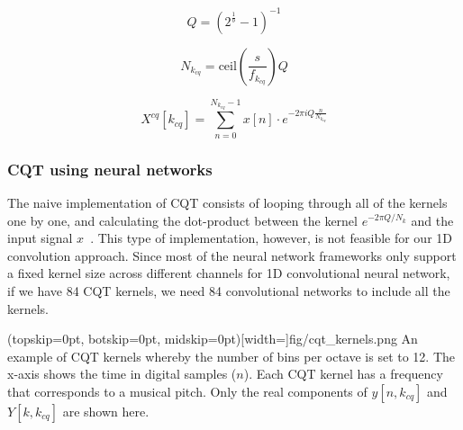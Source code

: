 \documentclass{ieeeaccess}
\begin{document}
\begin{equation}
    Q=(2^{\frac{1}{b}}-1)^{-1}
    \label{Q}
\end{equation}

\begin{equation}
    N_{k_{cq}}=   \text{ceil}{\left(\frac{s}{f_{k_{cq}}}\right)Q}
    \label{N_k}
\end{equation}

\begin{equation}
    X^{cq}[k_{cq}]= \sum_{n=0}^{N_{k_{cq}}-1}x[n]\cdot e^{-2\pi i Q \frac{n}{N_{k_{cq}}}}
    \label{CQT}
\end{equation}


\subsubsection{CQT using neural networks}
The naive implementation of CQT consists of looping through all of the kernels one by one, and calculating the dot-product between the kernel $e^{-2\pi Q/N_k}$ and the input signal $x$~\cite{brown1991calculation}. This type of implementation, however, is not feasible for our 1D convolution approach. Since most of the neural network frameworks only support a fixed kernel size across different channels for 1D convolutional neural network, if we have 84 CQT kernels, we need 84 convolutional networks to include all the kernels.


\Figure[h](topskip=0pt, botskip=0pt, midskip=0pt)[width=\linewidth]{fig/cqt_kernels.png}
{An example of CQT kernels whereby the number of bins per octave is set to 12. The x-axis shows the time in digital samples ($n$). Each CQT kernel has a frequency that corresponds to a musical pitch. Only the real components of $y[n, k_{cq}]$ and $Y[k, k_{cq}]$ are shown here.  \label{fig: CQT_kernels}}
\end{document}
